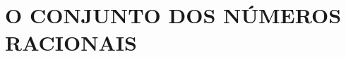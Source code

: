 \documentclass[../main.tex]{subfiles}
\begin{document}
\chapter{O CONJUNTO DOS NÚMEROS RACIONAIS}
\end{document}
